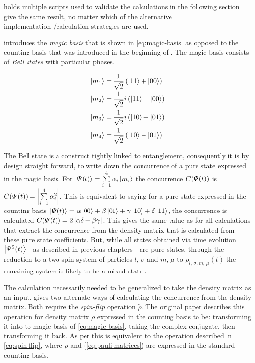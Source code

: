  holds multiple scripts used to validate the calculations in the following section give the same result, no matter which of the alternative implementation-/calculation-strategies are used.

\cite{concurrenceMainPaper} introduces the \emph{magic basis} that is shown in \autoref{eq:magic-basis} as opposed to the counting basis that was introduced in the beginning of . The magic basis consists of \emph{Bell states} with particular phases.

\begin{equation}
    \label{eq:magic-basis}
    \begin{split}
        \ketN[m_1] &= \frac{1}{\sqrt{2}} \left(\ketN[11] + \ketN[00]\right) \\
        \ketN[m_2] &= \frac{1}{\sqrt{2}} i \left(\ketN[11] - \ketN[00]\right) \\
        \ketN[m_3] &= \frac{1}{\sqrt{2}} i \left(\ketN[10] + \ketN[01]\right) \\
        \ketN[m_4] &= \frac{1}{\sqrt{2}} \left(\ketN[10] - \ketN[01]\right) \\
    \end{split}
\end{equation}

The Bell state is a construct tightly linked to entanglement, consequently it is by design straight forward, to write down the concurrence of a pure state expressed in the magic basis.
For $\ketN[\psiOfT] = \sum\limits_{i=1}^4 \alpha_i \ketN[m_i]$ the concurrence $C(\psiOfT)$ is $C(\psiOfT) = \left|\sum\limits_{i=1}^4 \alpha_i^2 \right|$.
This is equivalent to saying for a pure state expressed in the counting basis $\ketN[\psiOfT] = \alpha \ketN[00] +  \beta \ketN[01] +  \gamma \ketN[10] +  \delta\ketN[11]$, the concurrence is calculated $C(\psiOfT) = 2 \left|\alpha \delta - \beta \gamma\right|$.
This gives the same value as for all calculations that extract the concurrence from the density matrix that is calculated from these pure state coefficients.
But, while all states obtained via time evolution $\ketN[{\psiOfT[\schroedingerPicture]}]$ - as described in previous chapters - are pure states, through the reduction to a \glqq two-spin-system\grqq{} of particles $l,\,\sigma$ and $m,\,\mu$ to $\rho_{l,\,\sigma,\,m,\,\mu} (t)$ the remaining system is likely to be a mixed state \cite{mixedStateFromPureState}.

The calculation necessarily needed to be generalized to take the density matrix as an input.
\cite{concurrenceRewording} gives two alternate ways of calculating the concurrence from the density matrix.
Both require the \emph{spin-flip} operation $\tilde{\rho}$.
The original paper \cite{concurrenceMainPaper} describes this operation for density matrix $\rho$ expressed in the counting basis to be: transforming it into to magic basis of \autoref{eq:magic-basis}, taking the complex conjugate, then transforming it back.
As per \cite{concurrenceRewording} this is equivalent to the operation described in \autoref{eq:spin-flip}, where $\rho$ and  (\autoref{eq:pauli-matrices}) are expressed in the standard counting basis.

